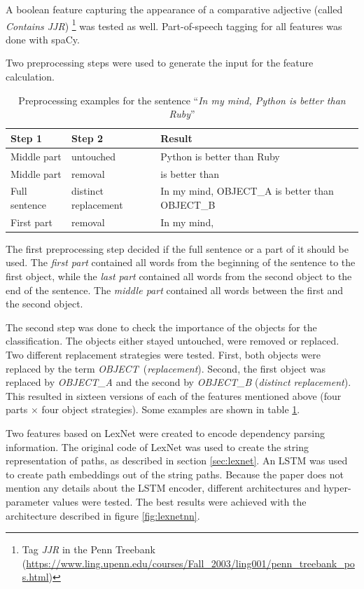 A boolean feature capturing the appearance of a comparative adjective (called \emph{Contains JJR}) \footnote{Tag \emph{JJR} in the Penn Treebank (\url{https://www.ling.upenn.edu/courses/Fall\_2003/ling001/penn\_treebank\_pos.html})} was tested as well. Part-of-speech tagging for all features was done with spaCy.\newline

Two preprocessing steps were used to generate the input for the feature calculation.
\begin{table}[ht]
\centering

\caption{Preprocessing examples for the sentence \enquote{\emph{In my mind, Python is better than Ruby}}}
\label{preprocessing_example}
\begin{tabularx}{\linewidth}{llX}
\toprule
Step 1 & Step 2 & Result \\ \midrule
Middle part & untouched & Python is better than Ruby \\
Middle part & removal & is better than \\
Full sentence & distinct replacement &In my mind, OBJECT\_A is better than OBJECT\_B \\
First part & removal & In my mind, \\
\bottomrule
\end{tabularx}

\end{table}

The first preprocessing step decided if the full sentence or a part of it should be used. The \emph{first part} contained all words from the beginning of the sentence to the first object, while the \emph{last part} contained all words from the second object to the end of the sentence. The \emph{middle part} contained all words between the first and the second object.

The second step was done to check the importance of the objects for the classification. The objects either stayed untouched, were removed or replaced. Two different replacement strategies were tested. First, both objects were replaced by the term \mbox{\emph{OBJECT} (\emph{replacement})}. Second, the first object was replaced by \emph{OBJECT\_A} and the second by \emph{OBJECT\_B} (\emph{distinct replacement}). This resulted in sixteen versions of each of the features mentioned above (four parts $\times$ four object strategies). Some examples are shown in table \ref{preprocessing_example}.\newline


\label{sec:lexnet_feat_desc}
Two features based on LexNet were created to encode dependency parsing information. The original code of LexNet was used to create the string representation of paths, as described in section \ref{sec:lexnet}. An LSTM was used to create path embeddings out of the string paths. Because the paper does not mention any details about the LSTM encoder, different architectures and hyper-parameter values were tested. The best results were achieved with the architecture described in figure \ref{fig:lexnetnn}.

